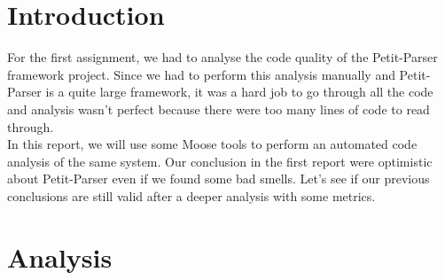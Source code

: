 

\usepackage{todonotes}


\section{Introduction}
For the first assignment, we had to analyse the code quality of the Petit-Parser framework project. Since we had to perform this analysis manually and Petit-Parser is a quite large framework, it was a hard job to go through all the code and analysis wasn't perfect because there were too many lines of code to read through. \\
In this report, we will use some Moose tools to perform an automated code analysis of the same system. Our conclusion in the first report were optimistic about Petit-Parser even if we found some bad smells. Let's see if our previous conclusions are still valid after a deeper analysis with some metrics.

\section{Analysis}
